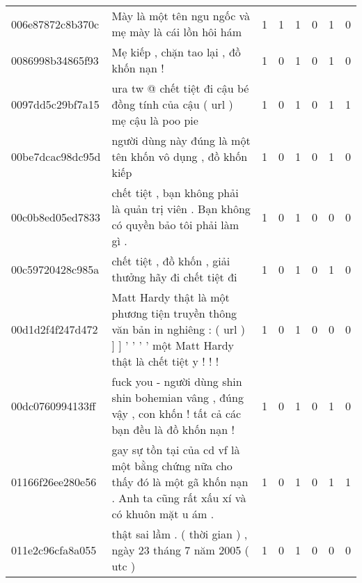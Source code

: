 \begin{center}
\begin{sidewaystable}[htb]
\begin{tabularx}{\textwidth}{L{0.8} L{6.6} C{0.1} C{0.1} C{0.1} C{0.1} C{0.1} C{0.1}}
            006e87872c8b370c & Mày là một tên ngu ngốc và mẹ mày là cái lồn hôi hám                                                                              & 1           & 1           & 1           & 0           & 1           & 0           \\
            0086998b34865f93 & Mẹ kiếp , chặn tao lại , đồ khốn nạn !                                                                                            & 1           & 0           & 1           & 0           & 1           & 0           \\
            0097dd5c29bf7a15 & ura tw @ chết tiệt đi cậu bé đồng tính của cậu ( url ) mẹ cậu là poo pie                                                          & 1           & 0           & 1           & 0           & 1           & 1           \\
            00be7dcac98dc95d & người dùng này đúng là một tên khốn vô dụng , đồ khốn kiếp                                                                        & 1           & 0           & 1           & 0           & 1           & 0           \\
            00c0b8ed05ed7833 & chết tiệt , bạn không phải là quản trị viên . Bạn không có quyền bảo tôi phải làm gì .                                            & 1           & 0           & 1           & 0           & 0           & 0           \\
            00c59720428c985a & chết tiệt , đồ khốn , giải thưởng hãy đi chết tiệt đi                                                                             & 1           & 0           & 1           & 0           & 1           & 0           \\
            00d1d2f4f247d472 & Matt Hardy thật là một phương tiện truyền thông văn bản in nghiêng : ( url ) ] ] ' ' ' ' một Matt Hardy thật là chết tiệt y ! ! ! & 1           & 0           & 1           & 0           & 0           & 0           \\
            00dc0760994133ff & fuck you - người dùng shin shin bohemian vâng , đúng vậy , con khốn ! tất cả các bạn đều là đồ khốn nạn !                         & 1           & 0           & 1           & 0           & 1           & 0           \\
            01166f26ee280e56 & gay sự tồn tại của cd vf là một bằng chứng nữa cho thấy đó là một gã khốn nạn . Anh ta cũng rất xấu xí và có khuôn mặt u ám .     & 1           & 0           & 1           & 0           & 1           & 1           \\
            011e2c96cfa8a055 & thật sai lầm . ( thời gian ) , ngày 23 tháng 7 năm 2005 ( utc )                                                                   & 1           & 0           & 1           & 0           & 0           & 0           \\

\end{tabularx}
\end{sidewaystable}
\end{center}
